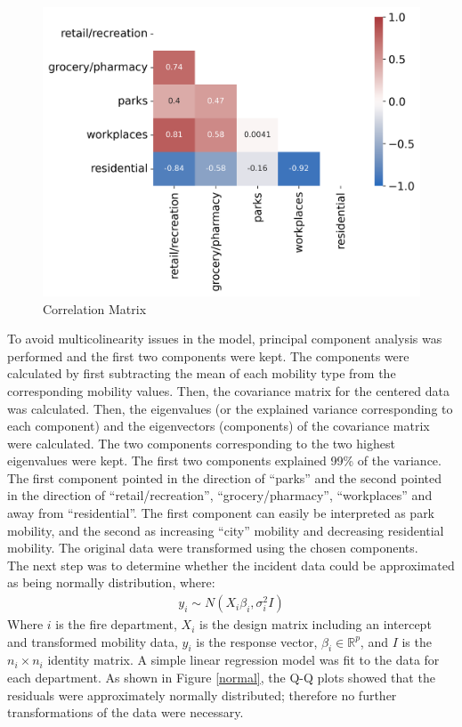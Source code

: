 \documentclass[paper=a4, fontsize=11pt]{scrartcl}
\begin{document}
\begin{figure}[h]\label{corr_mat}
\centering
\includegraphics[width=.7\textwidth]{corr.png}
\caption{Correlation Matrix}
\end{figure}

To avoid multicolinearity issues in the model, principal component analysis was performed and the first two components were kept. The components were calculated by first subtracting the mean of each mobility type from the corresponding mobility values. Then, the covariance matrix for the centered data was calculated. Then, the eigenvalues (or the explained variance corresponding to each component) and the eigenvectors (components) of the covariance matrix were calculated. The two components corresponding to the two highest eigenvalues were kept. The first two components explained 99\% of the variance. The first component  pointed in the direction of ``parks'' and the second pointed in the direction of ``retail/recreation'', ``grocery/pharmacy'', ``workplaces'' and away from ``residential''. The first component can easily be interpreted as park mobility, and the second as increasing ``city'' mobility and decreasing residential mobility. The original data were transformed using the chosen components.\\

The next step was to determine whether the incident data could be approximated as being normally distribution, where:
\begin{align*}
    y_i \sim N(X_i \beta_i, \sigma_i^2I)
\end{align*}
Where $i$ is the fire department, $X_i$ is the design matrix including an intercept and transformed mobility data, $y_i$ is the response vector, $\beta_i \in \mathbb{R}^{p}$, and $I$ is the $n_i \times n_i$ identity matrix.  A simple linear regression model was fit to the data for each department. As shown in Figure \ref{normal}, the Q-Q plots showed  that the residuals were approximately normally distributed; therefore no further transformations of the data were necessary.\\
\end{document}
